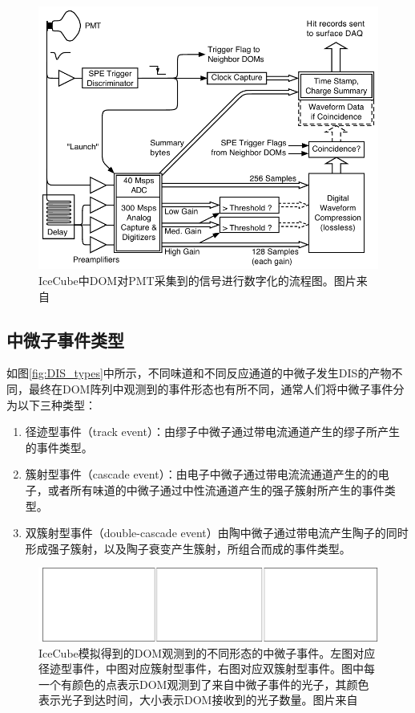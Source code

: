 \begin{figure}[htb]
    \centering
    \includegraphics[width=0.8\linewidth]{img/IC_DOM_data_flow.pdf}
    \caption{IceCube中DOM对PMT采集到的信号进行数字化的流程图。图片来自\cite{IceCube_detector:2016}}
    \label{fig:IC_DOM_data_flow}
\end{figure}

\subsection{中微子事件类型}

如图\ref{fig:DIS_types}中所示，不同味道和不同反应通道的中微子发生DIS的产物不同，最终在DOM阵列中观测到的事件形态也有所不同，通常人们将中微子事件分为以下三种类型：
\begin{enumerate}
    \item 径迹型事件（track event）：由缪子中微子通过带电流通道产生的缪子所产生的事件类型。
    \item 簇射型事件（cascade event）：由电子中微子通过带电流流通道产生的的电子，或者所有味道的中微子通过中性流通道产生的强子簇射所产生的事件类型。
    \item 双簇射型事件（double-cascade event）由陶中微子通过带电流产生陶子的同时形成强子簇射，以及陶子衰变产生簇射，所组合而成的事件类型。
\end{enumerate}

\begin{figure}[htb]
    \centering
    \includegraphics[width=1.0\linewidth]{img/event_topologies.pdf}
    \caption{IceCube模拟得到的DOM观测到的不同形态的中微子事件。左图对应径迹型事件，中图对应簇射型事件，右图对应双簇射型事件。图中每一个有颜色的点表示DOM观测到了来自中微子事件的光子，其颜色表示光子到达时间，大小表示DOM接收到的光子数量。图片来自\cite{IceCube-Gen2_white_paper:2020}}
    \label{fig:event_topologies}
\end{figure}


